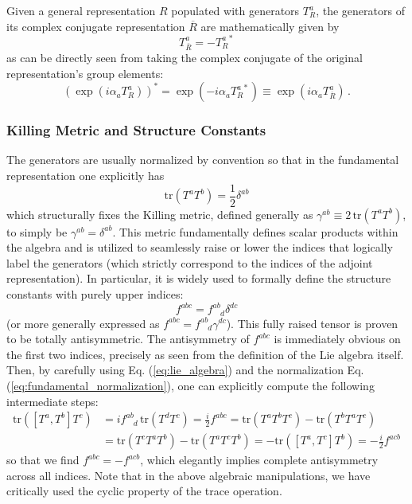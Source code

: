 Given a general representation \(R\) populated with generators \(T_R^a\), the generators of its complex conjugate representation \(\overline{R}\) are mathematically given by
\begin{equation} \label{eq:conjugate_generators}
    T_{\overline{R}}^a = -T_R^{a \, *}
\end{equation}
as can be directly seen from taking the complex conjugate of the original representation's group elements:
\[
    (\exp(i\alpha_a T_R^a))^* = \exp(-i\alpha_a T_R^{a \, *}) \equiv \exp(i\alpha_a T_{\overline{R}}^a) \, .
\]

\subsubsection{Killing Metric and Structure Constants}

The generators are usually normalized by convention so that in the fundamental representation one explicitly has
\begin{equation} \label{eq:fundamental_normalization}
    \mathrm{tr}(T^a T^b) = \frac{1}{2}\delta^{ab}
\end{equation}
which structurally fixes the Killing metric, defined generally as \(\gamma^{ab} \equiv 2\,\mathrm{tr}(T^a T^b)\), to simply be \(\gamma^{ab} = \delta^{ab}\). This metric fundamentally defines scalar products within the algebra and is utilized to seamlessly raise or lower the indices that logically label the generators (which strictly correspond to the indices of the adjoint representation). In particular, it is widely used to formally define the structure constants with purely upper indices:
\begin{equation} \label{eq:structure_upper}
    f^{abc} = f^{ab}_{\phantom{ab}d} \delta^{dc}
\end{equation}
(or more generally expressed as \(f^{abc} = f^{ab}_{\phantom{ab}d}\gamma^{dc}\)). This fully raised tensor is proven to be totally antisymmetric. The antisymmetry of \(f^{abc}\) is immediately obvious on the first two indices, precisely as seen from the definition of the Lie algebra itself. Then, by carefully using Eq. (\ref{eq:lie_algebra}) and the normalization Eq. (\ref{eq:fundamental_normalization}), one can explicitly compute the following intermediate steps:
\[
    \begin{aligned}
        \mathrm{tr}([T^a, T^b]T^c) & = i f^{ab}_{\phantom{ab}d} \,\mathrm{tr}(T^d T^c) = \frac{i}{2} f^{abc} = \mathrm{tr}(T^a T^b T^c) - \mathrm{tr}(T^b T^a T^c) \\
                                   & = \mathrm{tr}(T^c T^a T^b) - \mathrm{tr}(T^a T^c T^b) = -\mathrm{tr}([T^a, T^c]T^b) = -\frac{i}{2} f^{acb}
    \end{aligned}
\]
so that we find \(f^{abc} = -f^{acb}\), which elegantly implies complete antisymmetry across all indices. Note that in the above algebraic manipulations, we have critically used the cyclic property of the trace operation.


